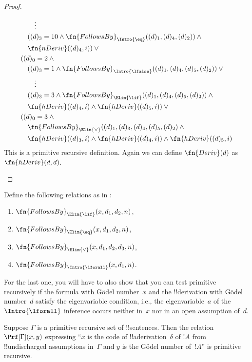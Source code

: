\documentclass[../../../include/open-logic-section]{subfiles}
\begin{document}
\begin{proof}
\begin{enumerate}
\begin{multline*}
\begin{aligned}
& \qquad \vdots\\
& \quad ((d)_3 = 10 \land
\fn{FollowsBy}_{\Intro{\eq}}((d)_1, (d)_4, (d)_2)) \land {}\\
& \quad \fn{nDeriv}((d)_4, i)) \lor {}\\
& ((d)_0 = 2 \land {}\\
& \quad ((d)_3 = 1 \land 
\fn{FollowsBy}_{\Intro{\lfalse}}((d)_1, (d)_4, (d)_5, (d)_2)) \lor{}\\
& \qquad \vdots\\
& \quad ((d)_3 = 3 \land
\fn{FollowsBy}_{\Elim{\lif}}((d)_1, (d)_4, (d)_5, (d)_2)) \land {}\\
& \quad \fn{hDeriv}((d)_4, i) \land \fn{hDeriv}((d)_5, i)) \lor {}\\
& ((d)_0 = 3 \land {}\\
& \quad \fn{FollowsBy}_{\Elim{\lor}}((d)_1, (d)_3, (d)_4, (d)_5, (d)_2) \land{}\\
& \quad \fn{hDeriv}((d)_3, i) \land \fn{hDeriv}((d)_4, i)) \land \fn{hDeriv}((d)_5, i)  
  \end{aligned}
  \end{multline*}
This is a primitive recursive definition. Again we can define
$\fn{Deriv}(d)$ as $\fn{hDeriv}(d, d)$.
\end{enumerate}
\end{proof}

\begin{prob}
Define the following relations as in
:
\begin{enumerate}
\item $\fn{FollowsBy}_{\Elim{\lif}}(x, d_1, d_2, n)$,
\item $\fn{FollowsBy}_{\Elim{\eq}}(x, d_1, d_2, n)$,
\item $\fn{FollowsBy}_{\Elim{\lor}}(x, d_1, d_2, d_3, n)$,
\item $\fn{FollowsBy}_{\Intro{\lforall}}(x, d_1, n)$.
\end{enumerate}
For the last one, you will have to also show that you can test
primitive recursively if the formula with G\"odel number~$x$ and the
!!{derivation} with G\"odel number~$d$ satisfy the eigenvariable
condition, i.e., the eigenvariable~$a$ of the $\Intro{\lforall}$
inference occurs neither in~$x$ nor in an open assumption of~$d$.
\end{prob}

\begin{prop}
Suppose $\Gamma$ is a primitive recursive set of !!{sentence}s.  Then
the relation $\Prf[\Gamma](x, y)$ expressing ``$x$ is the code of
!!a{derivation}~$\delta$ of $!A$ from !!{undischarged} assumptions
in~$\Gamma$ and $y$ is the G\"odel number of~$!A$'' is primitive
recursive.
\end{prop}
\end{document}
